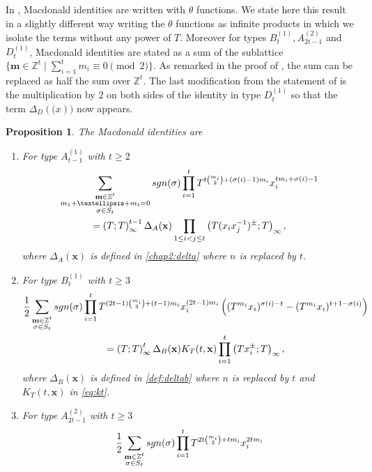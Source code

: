 \documentclass[11pt,letterpaper]{amsart}
\def\bbbz{\mathbb Z}
\def\sgn{{\rm sgn}}
\newtheorem{prop}[df]{Proposition}		%
\numberwithin{equation}{section}
\numberwithin{df}{section}
\begin{document}
In \cite[Corollary $6.2$]{RS}, Macdonald identities are written with $\theta$ functions. We state here this result in a slightly different way writing the $\theta$ functions as infinite products in which we isolate the terms without any power of $T$. Moreover for types $B^{(1)}_{t}, A^{(2)}_{2t-1}$ and $D^{(1)}_{t}$, Macdonald identities are stated as a sum of the sublattice $\lbrace \mathbf{m}\in\bbbz^t\mid \sum_{i=1}^t m_i\equiv 0 \pmod{2}\rbrace$. As remarked in the proof of \cite[Corollary $6.2$]{RS}, the sum can be replaced as half the sum over $\bbbz^t$. The last modification from the statement of \cite[Corollary $6.2$]{RS} is the multiplication by $2$ on both sides of the identity in type $D_t^{(1)}$ so that the term $\Delta_D(\mathbf(x))$ now appears.
\begin{prop}\cite[Corollary $6.2$]{RS}\label{prop:RS}
The Macdonald identities are
\begin{enumerate}
\item For type $A^{(1)}_{t-1}$ with $t\geq 2$
\begin{multline}\label{eq:macdoAstart}
\sum_{\substack{\mathbf{m}\in\bbbz^t\\m_1+\dots+m_t=0\\\sigma\in S_t}}\sgn(\sigma)\prod_{i=1}^tT^{t\binom{m_i}{2}+(\sigma(i)-1)m_i}x_i^{tm_i+\sigma(i)-1}
\\ =\left(T;T\right)_\infty^{t-1}\Delta_A(\mathbf{x}) \prod_{1\le i<j\le t}\left(T(x_ix_j^{-1})^{\pm};T\right)_\infty,
\end{multline}
where $\Delta_A(\mathbf{x})$ is defined in \eqref{chap2:delta} where $n$ is replaced by $t$.
\item For type $B^{(1)}_{t}$ with $t\geq 3$
\begin{multline}\label{eq:macdoBstart}
\frac{1}{2}\sum_{\substack{\mathbf{m}\in\bbbz^t\\\sigma\in S_t}}\sgn(\sigma)\prod_{i=1}^tT^{(2t-1)\binom{m_i}{2}+(t-1)m_i}x_i^{(2t-1)m_i}
\left((T^{m_i}x_i)^{\sigma(i)-t}-(T^{m_i}x_i)^{t+1-\sigma(i)}\right)\\
=\left(T;T\right)_\infty^{t}\Delta_B(\mathbf{x}) K_T(t,\mathbf{x})\prod_{i=1}^t \left(Tx_i^{\pm};T\right)_\infty,
\end{multline}
where $\Delta_B(\mathbf{x})$ is defined in \eqref{def:deltab} where $n$ is replaced by $t$ and $K_T(t,\mathbf{x})$ in \eqref{eq:kt}.
\item For type $A^{(2)}_{2t-1}$ with $t\geq 3$
\begin{multline*}
\frac{1}{2}\sum_{\substack{\mathbf{m}\in\bbbz^t\\\sigma\in S_t}}\sgn(\sigma)\prod_{i=1}^tT^{2t\binom{m_i}{2}+tm_i}x_i^{2tm_i}

\end{multline*}
\end{enumerate}
\end{prop}
\end{document}
